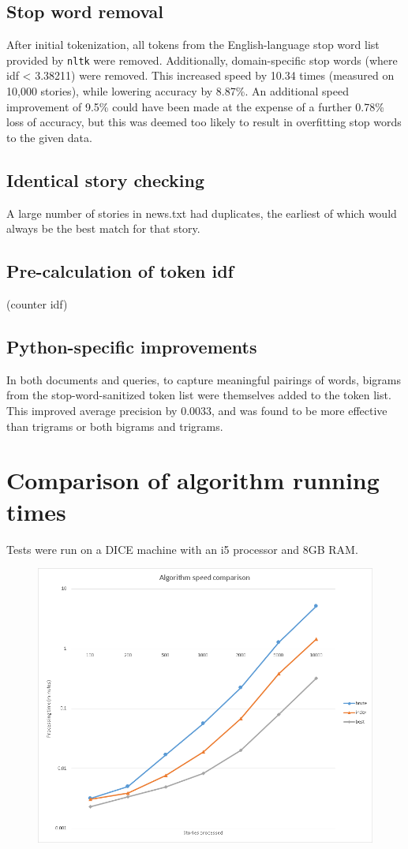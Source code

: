 \documentclass{article}
\begin{document}
\subsection{Stop word removal}
After initial tokenization, all tokens from the English-language stop word list provided by \texttt{nltk} were removed. Additionally, domain-specific stop words (where idf < 3.38211) were removed. This increased speed by 10.34 times (measured on 10,000 stories), while lowering accuracy by 8.87\%. An additional speed improvement of 9.5\% could have been made at the expense of a further 0.78\% loss of accuracy, but this was deemed too likely to result in overfitting stop words to the given data.
\subsection{Identical story checking}
A large number of stories in news.txt had duplicates, the earliest of which would always be the best match for that story. 
\subsection{Pre-calculation of token idf}
(counter idf)
\subsection{Python-specific improvements}
In both documents and queries, to capture meaningful pairings of words, bigrams from the stop-word-sanitized token list were themselves added to the token list. This improved average precision by 0.0033, and was found to be more effective than trigrams or both bigrams and trigrams.

\section{Comparison of algorithm running times}
Tests were run on a DICE machine with an i5 processor and 8GB RAM.
\begin{figure}[ht!]
\centering
\includegraphics[width=180mm]{algos.png}
\end{figure}
\end{document}
